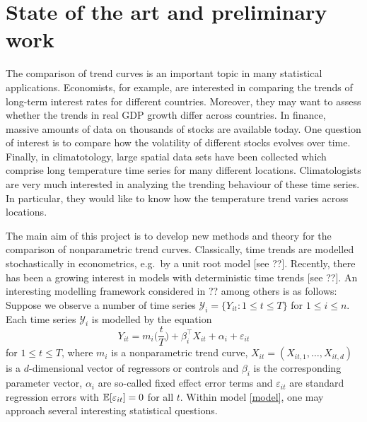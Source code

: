 \documentclass[a4paper,12pt]{article}
\begin{document}
\vspace{30pt}

\setcounter{section}{0}


\section{State of the art and preliminary work}


The comparison of trend curves is an important topic in many statistical applications. Economists, for example, are interested in comparing the trends of long-term interest rates for different countries. Moreover, they may want to assess whether the trends in real GDP growth differ across countries. In finance, massive amounts of data on thousands of stocks are available today. One question of interest is to compare how the volatility of different stocks evolves over time. Finally, in climatotology, large spatial data sets have been collected which comprise long temperature time series for many different locations. Climatologists are very much interested in analyzing the trending behaviour of these time series. In particular, they would like to know how the temperature trend varies across locations. 


The main aim of this project is to develop new methods and theory for the comparison of nonparametric trend curves. Classically, time trends are modelled stochastically in econometrics, e.g.\ by a unit root model [see ??]. Recently, there has been a growing interest in models with deterministic time trends [see ??]. An interesting modelling framework considered in ?? among others is as follows: Suppose we observe a number of time series $\mathcal{Y}_i = \{ Y_{it}: 1 \le t \le T \}$ for $1 \le i \le n$. Each time series $\mathcal{Y}_i$ is modelled by the equation
\begin{equation}\label{model}
Y_{it} = m_i \Big( \frac{t}{T} \Big) + \beta_i^\top X_{it} + \alpha_i + \varepsilon_{it}
\end{equation}
for $1 \le t \le T$, where $m_i$ is a nonparametric trend curve, $X_{it} = (X_{it,1},\ldots,X_{it,d})$ is a $d$-dimensional vector of regressors or controls and $\beta_i$ is the corresponding parameter vector, $\alpha_i$ are so-called fixed effect error terms and $\varepsilon_{it}$ are standard regression errors with $\mathbb{E}[\varepsilon_{it}] = 0$ for all $t$. Within model \eqref{model}, one may approach several interesting statistical questions.
\vspace{15pt}
\end{document}
